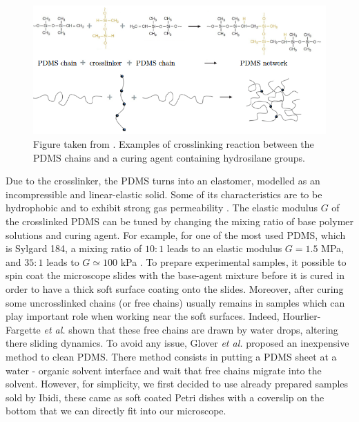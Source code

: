 \begin{figure}[H]
	\centering
	\includegraphics[scale = 0.8]{02_body/chapter4/images/EHD_forces/figure_cross.png}
	\caption{Figure taken from \cite{tucher_analysis_2016}. Examples of crosslinking reaction between the \gls{PDMS} chains and a curing agent containing hydrosilane groups.}
	\label{fig.crosslink}
\end{figure}


Due to the crosslinker, the \gls{PDMS} turns into an elastomer, modelled as an incompressible and linear-elastic solid. Some of its characteristics are to be hydrophobic and to exhibit strong gas permeability \cite{xia_soft_1998}. The elastic modulus $G$ of the crosslinked \gls{PDMS} can be tuned by changing the mixing ratio of base polymer solutions and curing agent. For example, for one of the most used \gls{PDMS}, which is Sylgard 184, a mixing ratio of $10:1$ leads to an elastic modulus $G=1.5$ MPa, and $35:1$ leads to $G\simeq 100$ kPa \cite{wang_crosslinking_2014}. To prepare experimental samples, it possible to spin coat the microscope slides with the base-agent mixture before it is cured in order to have a thick soft surface coating onto the slides. Moreover, after curing some uncrosslinked chains (or free chains) usually remains in samples which can play important role when working near the soft surfaces. Indeed, Hourlier-Fargette \textit{et al.} \cite{hourlier-fargette_role_2017} shown that these free chains are drawn by water drops, altering there sliding dynamics. To avoid any issue, Glover \textit{et al.}  \cite{glover_extracting_2020} proposed an inexpensive method to clean \gls{PDMS}. There method consists in putting a \gls{PDMS} sheet at a water - organic solvent interface and wait that free chains migrate into the solvent. However, for simplicity, we first decided to use already prepared samples sold by Ibidi, these came as soft coated Petri dishes with a coverslip on the bottom that we can directly fit into our microscope.


